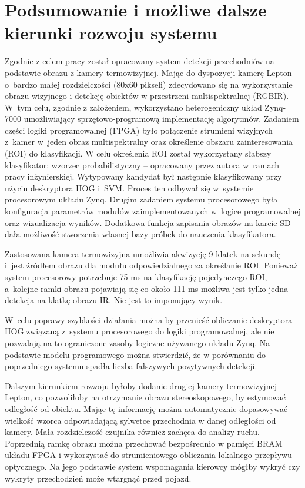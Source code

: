 \chapter{Podsumowanie i możliwe dalsze kierunki rozwoju systemu}

Zgodnie z celem pracy został opracowany system detekcji przechodniów na podstawie obrazu z kamery termowizyjnej. 
Mając do dyspozycji kamerę Lepton o~bardzo małej rozdzielczości (80x60 pikseli) zdecydowano się na wykorzystanie obrazu wizyjnego i detekcję obiektów w przestrzeni multispektralnej (RGBIR). 
W~tym celu, zgodnie z założeniem, wykorzystano heterogeniczny układ Zynq-7000 umożliwiający sprzętowo-programową implementację algorytmów.
Zadaniem części logiki programowalnej (FPGA) było połączenie strumieni wizyjnych z~kamer w~jeden obraz multispektralny oraz określenie obszaru zainteresowania (ROI) do klasyfikacji. 
W celu określenia ROI został wykorzystany słabszy klasyfikator: wzorzec probabilistyczny -- opracowany przez autora w~ramach pracy inżynierskiej. 
Wytypowany kandydat był następnie klasyfikowany przy użyciu deskryptora HOG i~SVM. 
Proces ten odbywał się w~systemie procesorowym układu Zynq. 
Drugim zadaniem systemu procesorowego była konfiguracja parametrów modułów zaimplementowanych w~logice programowalnej oraz wizualizacja wyników. 
Dodatkowa funkcja zapisania obrazów na karcie SD dała możliwość stworzenia własnej bazy próbek do nauczenia klasyfikatora.

Zastosowana kamera termowizyjna umożliwia akwizycję 9 klatek na sekundę i~jest źródłem obrazu dla modułu odpowiedzialnego za określanie ROI. 
Ponieważ system procesorowy potrzebuje 75 ms na klasyfikację pojedynczego ROI, a~kolejne ramki obrazu pojawiają się co około 111 ms możliwa jest tylko jedna detekcja na klatkę obrazu IR. 
Nie jest to imponujący wynik. %

W~celu poprawy szybkości działania można by przenieść obliczanie deskryptora HOG związaną z~systemu procesorowego do logiki programowalnej, ale nie pozwalają na to ograniczone zasoby logiczne używanego układu Zynq. 
Na podstawie modelu programowego można stwierdzić, że w porównaniu do poprzedniego systemu spadła liczba fałszywych pozytywnych detekcji. 

Dalszym kierunkiem rozwoju byłoby dodanie drugiej kamery termowizyjnej Lepton, co pozwoliłoby na otrzymanie obrazu stereoskopowego, by estymować odległość od obiektu. Mając tę informację można automatycznie dopasowywać wielkość wzorca odpowiadającą sylwetce przechodnia w danej odległości od kamery. Mała rozdzielczość czujnika również zachęca do analizy ruchu. Poprzednią ramkę obrazu można przechować bezpośrednio w pamięci BRAM układu FPGA i wykorzystać do strumieniowego obliczania lokalnego przepływu optycznego. Na jego podstawie system wspomagania kierowcy mógłby wykryć czy wykryty przechodzień może wtargnąć przed pojazd.
